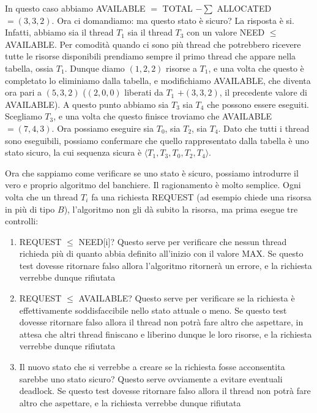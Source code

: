 \documentclass[11pt, a4paper, titlepage, oneside]{scrbook}
\begin{document}
In questo caso abbiamo AVAILABLE $=$ TOTAL $- \sum$ ALLOCATED $= (3,3,2)$. Ora ci domandiamo: ma questo stato è sicuro? La risposta è si. Infatti, abbiamo sia il thread $T_1$ sia il thread $T_3$ con un valore NEED $\leq$ AVAILABLE. Per comodità quando ci sono più thread che potrebbero ricevere tutte le risorse disponibili prendiamo sempre il primo thread che appare nella tabella, ossia $T_1$. Dunque diamo $(1,2,2)$ risorse a $T_1$, e una volta che questo è completato lo eliminiamo dalla tabella, e modifichiamo AVAILABLE, che diventa ora pari a $(5,3,2)$ ($(2,0,0)$ liberati da $T_1$ $+ (3,3,2)$, il precedente valore di AVAILABLE). A questo punto abbiamo sia $T_3$ sia $T_4$ che possono essere eseguiti. Scegliamo $T_3$, e una volta che questo finisce troviamo che AVAILABLE $= (7,4,3)$. Ora possiamo eseguire sia $T_0$, sia $T_2$, sia $T_4$. Dato che tutti i thread sono eseguibili, possiamo confermare che quello rappresentato dalla tabella è uno stato sicuro, la cui sequenza sicura è $\langle T_1, T_3, T_0, T_2, T_4 \rangle$. 

Ora che sappiamo come verificare se uno stato è sicuro, possiamo introdurre il vero e proprio algoritmo del banchiere. Il ragionamento è molto semplice. Ogni volta che un thread $T_i$ fa una richiesta REQUEST (ad esempio chiede una risorsa in più di tipo $B$), l'algoritmo non gli dà subito la risorsa, ma prima esegue tre controlli:
\begin{enumerate}[label=\arabic*°]
    \item REQUEST $\leq$ NEED[i]? Questo serve per verificare che nessun thread richieda più di quanto abbia definito all'inizio con il valore MAX. Se questo test dovesse ritornare falso allora l'algoritmo ritornerà un errore, e la richiesta verrebbe dunque rifiutata
    \item REQUEST $\leq$ AVAILABLE? Questo serve per verificare se la richiesta è effettivamente soddisfaccibile nello stato attuale o meno. Se questo test dovesse ritornare falso allora il thread non potrà fare altro che aspettare, in attesa che altri thread finiscano e liberino dunque le loro risorse, e la richiesta verrebbe dunque rifiutata
    \item Il nuovo stato che si verrebbe a creare se la richiesta fosse acconsentita sarebbe uno stato sicuro? Questo serve ovviamente a evitare eventuali deadlock. Se questo test dovesse ritornare falso allora il thread non potrà fare altro che aspettare, e la richiesta verrebbe dunque rifiutata
\end{enumerate}
\end{document}
